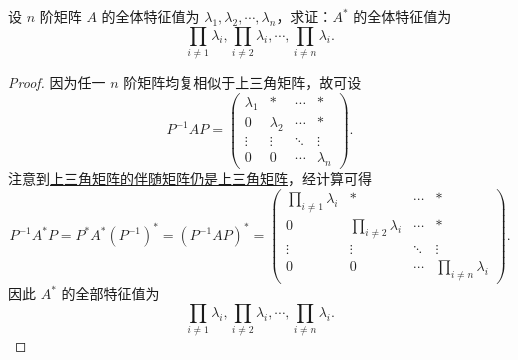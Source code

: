 \documentclass[../../main.tex]{subfiles}%
\begin{document}
\begin{proposition}[伴随矩阵的特征值]\label{proposition:伴随矩阵的特征值}
设 \( n \) 阶矩阵 \( A \) 的全体特征值为 \( \lambda_1, \lambda_2, \cdots, \lambda_n \)，求证：\( A^* \) 的全体特征值为 
\[
\prod_{i \neq 1} \lambda_i, \prod_{i \neq 2} \lambda_i, \cdots, \prod_{i \neq n} \lambda_i.
\]
\end{proposition}
\begin{proof}

因为任一 \( n \) 阶矩阵均复相似于上三角矩阵，故可设
\[
P^{-1}AP = 
\begin{pmatrix}
\lambda_1 & * & \cdots & * \\
0 & \lambda_2 & \cdots & * \\
\vdots & \vdots & \ddots & \vdots \\
0 & 0 & \cdots & \lambda_n
\end{pmatrix}.
\]
注意到\hyperref[proposition:上三角阵性质]{上三角矩阵的伴随矩阵仍是上三角矩阵}，经计算可得
\[
P^{-1}A^*P = P^*A^*(P^{-1})^* = (P^{-1}AP)^* = 
\begin{pmatrix}
\prod_{i \neq 1} \lambda_i & * & \cdots & * \\
0 & \prod_{i \neq 2} \lambda_i & \cdots & * \\
\vdots & \vdots & \ddots & \vdots \\
0 & 0 & \cdots & \prod_{i \neq n} \lambda_i
\end{pmatrix}.
\]
因此 \( A^* \) 的全部特征值为
\[
\prod_{i \neq 1} \lambda_i, \prod_{i \neq 2} \lambda_i, \cdots, \prod_{i \neq n} \lambda_i.
\]

\end{proof}
\end{document}
